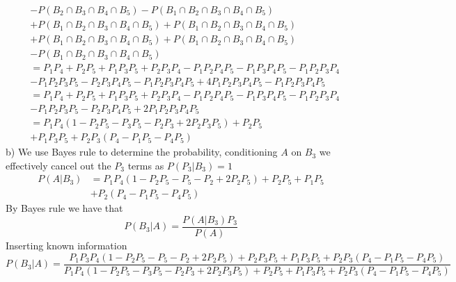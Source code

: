 \begin{align*}
        &-P(B_2\cap B_3\cap B_4\cap B_5)-P(B_1\cap B_2\cap B_3\cap B_4\cap B_5) \\
        &+P(B_1\cap B_2\cap B_3\cap B_4\cap B_5)+P(B_1\cap B_2\cap B_3\cap B_4\cap B_5) \\
        &+P(B_1\cap B_2\cap B_3\cap B_4\cap B_5)+P(B_1\cap B_2\cap B_3\cap B_4\cap B_5) \\
        &-P(B_1\cap B_2\cap B_3\cap B_4\cap B_5) \\
        &=P_1P_4+P_2P_5+P_1P_3P_5+P_2P_3P_4-P_1P_2P_4P_5-P_1P_3P_4P_5-P_1P_2P_3P_4 \\
        &-P_1P_2P_3P_5-P_2P_3P_4P_5-P_1P_2P_3P_4P_5+4P_1P_2P_3P_4P_5-P_1P_2P_3P_4P_5 \\
        &=P_1P_4+P_2P_5+P_1P_3P_5+P_2P_3P_4-P_1P_2P_4P_5-P_1P_3P_4P_5-P_1P_2P_3P_4 \\
        &-P_1P_2P_3P_5-P_2P_3P_4P_5+2P_1P_2P_3P_4P_5 \\
        &=P_1P_4(1-P_2P_5-P_3P_5-P_2P_3+2P_2P_3P_5)+P_2P_5 \\
        &+P_1P_3P_5+P_2P_3(P_4-P_1P_5-P_4P_5)
\end{align*}
b)
We use Bayes rule to determine the probability, conditioning $A$ on $B_3$ we effectively cancel out the $P_3$ terms as $P(P_3|B_3)=1$
\begin{align*}
    P(A|B_3)&=P_1P_4(1-P_2P_5-P_5-P_2+2P_2P_5)+P_2P_5+P_1P_5 \\
           &+P_2(P_4-P_1P_5-P_4P_5)
\end{align*}
By Bayes rule we have that
\[
    P(B_3|A)=\frac{P(A|B_3)P_3}{P(A)}
\]
Inserting known information
\[
    P(B_3|A)=\frac{P_1P_3P_4(1-P_2P_5-P_5-P_2+2P_2P_5)+P_2P_3P_5+P_1P_3P_5+P_2P_3(P_4-P_1P_5-P_4P_5)}
    {P_1P_4(1-P_2P_5-P_3P_5-P_2P_3+2P_2P_3P_5)+P_2P_5+P_1P_3P_5+P_2P_3(P_4-P_1P_5-P_4P_5)}
\]
